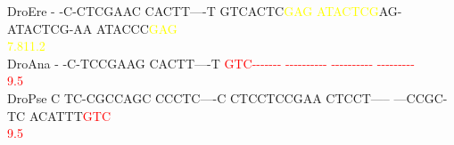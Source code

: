 \documentclass[11pt,twoside,reqno,a4paper]{article}
\begin{document}
{DroEre	-	-C-CTCGAAC	CACTT----T	GTCACTC\textcolor{Yellow}{G}\textcolor{Yellow}{A}\textcolor{Yellow}{G}	\textcolor{Yellow}{A}\textcolor{Yellow}{T}\textcolor{Yellow}{A}\textcolor{Yellow}{C}\textcolor{Yellow}{T}\textcolor{Yellow}{C}\textcolor{Yellow}{G}AG-	ATACTCG-AA	ATACCC\textcolor{Yellow}{G}\textcolor{Yellow}{A}\textcolor{Yellow}{G}\\
\hspace*{7\charwidth}\hspace*{1\charwidth}\hspace*{1\charwidth}\hspace*{1\charwidth}\hspace*{28\charwidth}\textcolor{Yellow}{7.8}\hspace*{1\charwidth}\hspace*{1\charwidth}\hspace*{1\charwidth}\hspace*{26\charwidth}\textcolor{Yellow}{11.2}\hspace*{1\charwidth}\\
DroAna	-	-C-TCCGAAG	CACTT----T	\textcolor{Red}{G}\textcolor{Red}{T}\textcolor{Red}{C}\textcolor{Red}{-}\textcolor{Red}{-}\textcolor{Red}{-}\textcolor{Red}{-}\textcolor{Red}{-}\textcolor{Red}{-}\textcolor{Red}{-}	\textcolor{Red}{-}\textcolor{Red}{-}\textcolor{Red}{-}\textcolor{Red}{-}\textcolor{Red}{-}\textcolor{Red}{-}\textcolor{Red}{-}\textcolor{Red}{-}\textcolor{Red}{-}\textcolor{Red}{-}	\textcolor{Red}{-}\textcolor{Red}{-}\textcolor{Red}{-}\textcolor{Red}{-}\textcolor{Red}{-}\textcolor{Red}{-}\textcolor{Red}{-}\textcolor{Red}{-}\textcolor{Red}{-}\textcolor{Red}{-}	\textcolor{Red}{-}\textcolor{Red}{-}\textcolor{Red}{-}\textcolor{Red}{-}\textcolor{Red}{-}\textcolor{Red}{-}\textcolor{Red}{-}\textcolor{Red}{-}\textcolor{Red}{-}\\
\hspace*{7\charwidth}\hspace*{1\charwidth}\hspace*{1\charwidth}\hspace*{1\charwidth}\hspace*{21\charwidth}\textcolor{Red}{9.5}\hspace*{1\charwidth}\hspace*{1\charwidth}\hspace*{1\charwidth}\\
DroPse	C	TC-CGCCAGC	CCCTC----C	CTCCTCCGAA	CTCCT-----	---CCGC-TC	ACATTT\textcolor{Red}{G}\textcolor{Red}{T}\textcolor{Red}{C}\\
\hspace*{7\charwidth}\hspace*{1\charwidth}\hspace*{1\charwidth}\hspace*{1\charwidth}\hspace*{1\charwidth}\hspace*{1\charwidth}\hspace*{1\charwidth}\hspace*{57\charwidth}\textcolor{Red}{9.5}\hspace*{1\charwidth}\\
}
\end{document}
